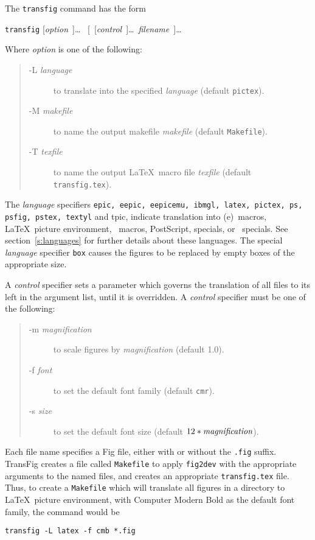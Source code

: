 The {\tt transfig} command has the form
%
\begin{center}
	{\tt transfig}	[{\it option}~]\ldots
			~[~[{\it control}~]\ldots ~{\it filename}~]\ldots
\end{center}
%
Where {\it option} is one of the following:
%
\begin{quote}
\begin{description}
\item[-L \it language]
	to translate into the specified {\it language}
	(default {\tt pictex}).
\item[-M \it makefile]
	to name the output makefile {\it makefile}
	(default {\tt Makefile}).
\item[-T \it texfile]
	to name the output \LaTeX\ macro file {\it texfile}
	(default {\tt transfig.tex}).
\end{description}
\end{quote}
%
The {\it language} specifiers
	{\tt epic, eepic, eepicemu, ibmgl, latex, pictex, ps,
	\linebreak psfig, pstex, textyl} and {tpic},
	indicate translation into
	{\sc (e)}\EPIC\ macros, \LaTeX\ picture environment,
	\PicTeX\ macros, PostScript,
	\textyl specials, or \tpic\ specials.
See section~\ref{s:languages} for further details about these languages.
The special {\it language} specifier {\tt box} causes the figures to be
	replaced by empty boxes of the appropriate size.

A {\it control} specifier sets a parameter which governs the translation
	of all files to its left in the argument list, until it is
	overridden.
A {\it control} specifier must be one of the following:
%
\begin{quote}
\begin{description}
\item[-m \it magnification]
	to scale figures by {\it magnification} (default 1.0).
\item[-f \it font]
	to set the default font family (default {\tt cmr}).
\item[-s \it size]
	to set the default font size (default $12*\mbox{\it magnification}$).
\end{description}
\end{quote}

Each file name specifies a Fig file, either with or without the {\tt .fig}
	suffix.
TransFig creates a file called {\tt Makefile} to apply {\tt fig2dev} with
	the appropriate arguments to the named files,
	and creates an appropriate {\tt transfig.tex} file.
Thus, to create a {\tt Makefile} which will translate all figures in a
	directory to \LaTeX\ picture environment, with Computer Modern Bold as
	the default font family, the command would be
%
\begin{center}
	{\tt transfig -L latex -f cmb *.fig}
\end{center}

